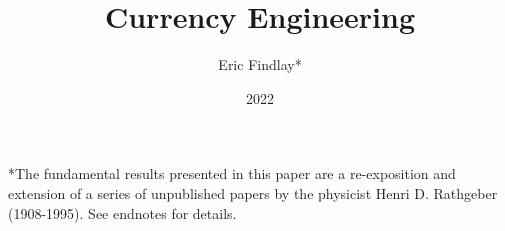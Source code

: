\documentclass[a4paper]{article}
\begin{document}
    \title{Currency Engineering}
    \author{Eric Findlay*}
    \date{2022}
    \maketitle

    *The fundamental results presented in this paper are a re-exposition and extension of a series
    of unpublished papers by the physicist Henri D. Rathgeber (1908-1995). See endnotes for details.

    \tableofcontents

    
    
    
    
    
    
    
    
    
    
    
    
    
\end{document}

